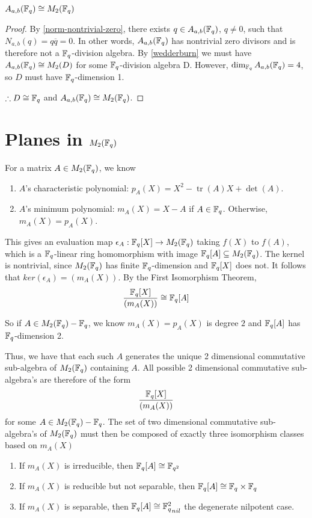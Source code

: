 \documentclass{amsart}
\begin{document}
\begin{theorem}
    $A_{a,b}(\protect\mathbb{F}_q) \cong M_2(\protect\mathbb{F}_q)$ 
\end{theorem}
\begin{proof}
    By \cref{norm-nontrivial-zero}, there exists $q \in A_{a,b}(\protect\mathbb{F}_q)$, $q \neq 0$, such that $N_{a,b}(q) = q \overline{q} = 0$. In other words, $A_{a,b}(\protect\mathbb{F}_q)$ has nontrivial zero divisors and is therefore not a $\protect\mathbb{F}_q$-division algebra. By \cref{wedderburn} we must have $A_{a,b}(\protect\mathbb{F}_q) \cong M_2(D)$ for some $\protect\mathbb{F}_q$-division algebra D. However, $\dim_{\protect\mathbb{F}_q} A_{a,b}(\protect\mathbb{F}_q) = 4$, so $D$ must have $\protect\mathbb{F}_q$-dimension 1.

    $\therefore D \cong \protect\mathbb{F}_q$ and $A_{a,b}(\protect\mathbb{F}_q) \cong M_2(\protect\mathbb{F}_q)$. 
\end{proof}

\section{Planes in $M_2(\protect\mathbb{F}_q)$}
    For a matrix $A \in M_2(\protect\mathbb{F}_q)$, we know
    \begin{enumerate}
        \item $A$'s characteristic polynomial: $p_A(X) = X^2 -\operatorname{tr}(A)X + \det(A)$.
        \item $A$'s minimum polynomial: $m_A(X) = X - A$ if $A \in \protect\mathbb{F}_q$. Otherwise, $m_A(X) = p_A(X)$.
    \end{enumerate}

    This gives an evaluation map $\epsilon_A : \protect\mathbb{F}_q[X] \rightarrow M_2(\protect\mathbb{F}_q)$ taking $f(X)$ to $f(A)$, which is a $\protect\mathbb{F}_q$-linear ring homomorphism with image $\protect\mathbb{F}_q[A] \subseteq M_2(\protect\mathbb{F}_q)$. The kernel is nontrivial, since $M_2(\protect\mathbb{F}_q)$ has finite $\protect\mathbb{F}_q$-dimension and $\protect\mathbb{F}_q[X]$ does not. It follows that $ker(\epsilon_A) = (m_A(X))$. By the First Isomorphism Theorem,
    \begin{align*}
        \frac{\protect\mathbb{F}_q[X]}{(m_A(X))} \cong \protect\mathbb{F}_q[A]
    \end{align*}

    So if $A \in M_2(\protect\mathbb{F}_q) - \protect\mathbb{F}_q$, we know $m_A(X) = p_A(X)$ is degree $2$ and $\protect\mathbb{F}_q[A]$ has $\protect\mathbb{F}_q$-dimension 2.

    Thus, we have that each such $A$ generates the unique 2 dimensional commutative sub-algebra of $M_2(\protect\mathbb{F}_q)$ containing $A$. All possible 2 dimensional commutative sub-algebra's are therefore of the form
    \begin{align*}
        \frac{\protect\mathbb{F}_q[X]}{(m_A(X))}
    \end{align*}
    for some $A \in M_2(\protect\mathbb{F}_q) - \protect\mathbb{F}_q$. The set of two dimensional commutative sub-algebra's of $M_2(\protect\mathbb{F}_q)$ must then be composed of exactly three isomorphism classes based on $m_A(X)$
    \begin{enumerate}
        \item If $m_A(X)$ is irreducible, then $\protect\mathbb{F}_q[A] \cong \protect\mathbb{F}_{q^2}$
        \item If $m_A(X)$ is reducible but not separable, then $\protect\mathbb{F}_q[A] \cong \protect\mathbb{F}_q \times \protect\mathbb{F}_q$
        \item If $m_A(X)$ is separable, then $\bF_q[A] \cong {\bF_q^2}_{nil}$ the degenerate nilpotent case.
    \end{enumerate}
\end{document}
